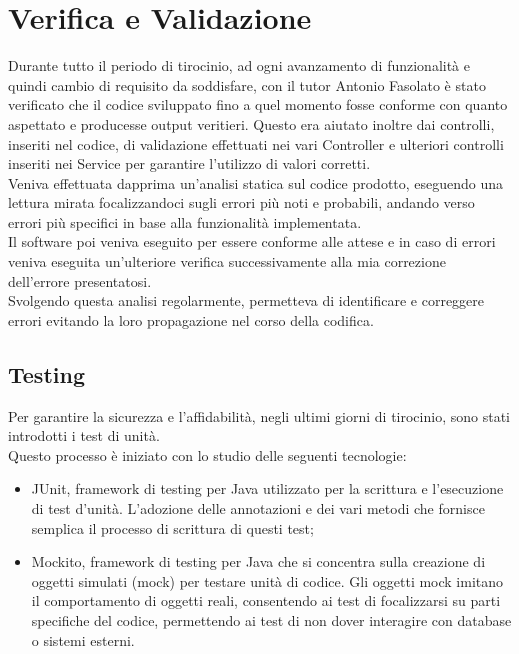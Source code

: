 \chapter{Verifica e Validazione}
\label{cap:verifica-validazione}
Durante tutto il periodo di tirocinio, ad ogni avanzamento di funzionalità e quindi cambio di requisito da soddisfare, con il tutor Antonio Fasolato è stato verificato che il codice sviluppato fino a quel momento fosse conforme con quanto aspettato e producesse output veritieri. Questo era aiutato inoltre dai controlli, inseriti nel codice, di validazione effettuati nei vari Controller e ulteriori controlli inseriti nei Service per garantire l’utilizzo di valori corretti.\\
Veniva effettuata dapprima un’analisi statica sul codice prodotto, eseguendo una lettura mirata focalizzandoci sugli errori più noti e probabili, andando verso errori più specifici in base alla funzionalità implementata.\\
Il software poi veniva eseguito per essere conforme alle attese e in caso di errori veniva eseguita un’ulteriore verifica successivamente alla mia correzione dell’errore presentatosi.\\
Svolgendo questa analisi regolarmente, permetteva di identificare e correggere errori evitando la loro propagazione nel corso della codifica.

\section{Testing}
Per garantire la sicurezza e l’affidabilità, negli ultimi giorni di tirocinio, sono stati introdotti i test di unità.\\
Questo processo è iniziato con lo studio delle seguenti tecnologie:
\begin{itemize}
\item JUnit, framework di testing per Java utilizzato per la scrittura e l’esecuzione di test d’unità. L’adozione delle annotazioni e dei vari metodi che fornisce semplica il processo di scrittura di questi test;
\item Mockito, framework di testing per Java che si concentra sulla creazione di oggetti simulati (mock) per testare unità di codice. Gli oggetti mock imitano il comportamento di oggetti reali, consentendo ai test di focalizzarsi su parti specifiche del codice, permettendo ai test di non dover interagire con database o sistemi esterni.
\end{itemize}

